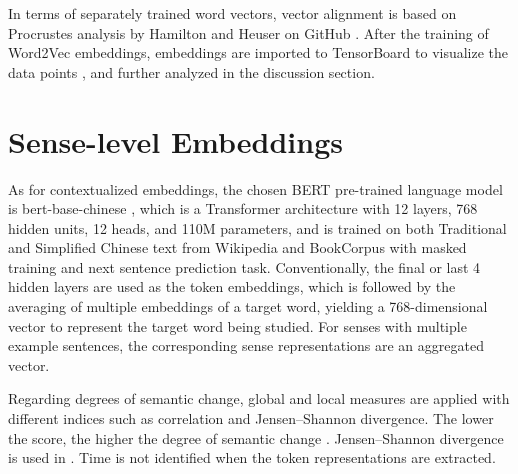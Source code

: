 In terms of separately trained word vectors, vector alignment is based on Procrustes analysis by Hamilton and Heuser on GitHub \parencite{hamilton2016law}. After the training of Word2Vec embeddings, embeddings are imported to TensorBoard to visualize the data points \parencite{smilkov2016projector}, and further analyzed in the discussion section.


\section{Sense-level Embeddings}
As for contextualized embeddings, the chosen BERT pre-trained language model is bert-base-chinese \parencite{devlin2018bert}, which is a Transformer architecture with 12 layers, 768 hidden units, 12 heads, and 110M parameters, and is trained on both Traditional and Simplified Chinese text from Wikipedia and BookCorpus with masked training and next sentence prediction task. Conventionally, the final or last 4 hidden layers are used as the token embeddings, which is followed by the averaging of multiple embeddings of a target word, yielding a 768-dimensional vector to represent the target word being studied. For senses with multiple example sentences, the corresponding sense representations are an aggregated vector.

Regarding degrees of semantic change, global and local measures are applied with different indices such as correlation and Jensen–Shannon divergence. The lower the score, the higher the degree of semantic change \parencite{hamilton2016law}. Jensen–Shannon divergence is used in \textcite{giulianelli2019lexical}. Time is not identified when the token representations are extracted.


